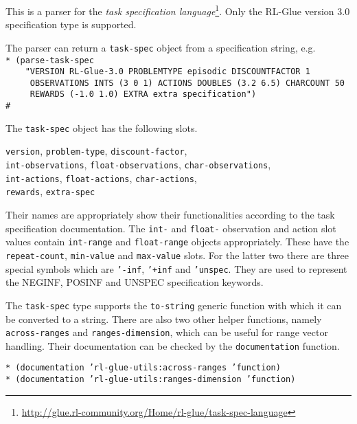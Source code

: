 \documentclass[11pt,a4paper,dvipdfm]{article}
\newcommand{\selfref}[1]{\href{#1}{#1}}
\newcommand{\footref}[2]{\textsl{#1}\footnote{\selfref{#2}}}
\newcommand{\prompttext}[1]{\texttt{#1}}
\newcommand{\lispprompt}[1]{\prompttext{* #1}}
\begin{document}
This is a parser for the
\footref{task specification language}
{http://glue.rl-community.org/Home/rl-glue/task-spec-language}. Only the
RL-Glue version 3.0 specification type is supported.

The parser can return a \prompttext{task-spec} object from a specification
string, e.g. \\
\lispprompt{(parse-task-spec \\
\mbox{~~~~}"VERSION RL-Glue-3.0 PROBLEMTYPE episodic DISCOUNTFACTOR 1 \\
\mbox{~~~~~}OBSERVATIONS INTS (3 0 1) ACTIONS DOUBLES (3.2 6.5) CHARCOUNT 50 \\
\mbox{~~~~~}REWARDS (-1.0 1.0) EXTRA extra specification") \\
\#<TASK-SPEC>}

The \prompttext{task-spec} object has the following slots.

\prompttext{version}, \prompttext{problem-type}, \prompttext{discount-factor}, \\
\prompttext{int-observations}, \prompttext{float-observations},
\prompttext{char-observations}, \\ \prompttext{int-actions},
\prompttext{float-actions}, \prompttext{char-actions}, \\
\prompttext{rewards}, \prompttext{extra-spec}

Their names are appropriately show their functionalities according to the task
specification documentation. The \prompttext{int-} and \prompttext{float-}
observation and action slot values contain \prompttext{int-range} and
\prompttext{float-range} objects appropriately. These have the
\prompttext{repeat-count}, \prompttext{min-value} and \prompttext{max-value}
slots. For the latter two there are three special symbols which are
\prompttext{'-inf}, \prompttext{'+inf} and \prompttext{'unspec}. They are used
to represent the NEGINF, POSINF and UNSPEC specification keywords.

The \prompttext{task-spec} type supports the \prompttext{to-string} generic
function with which it can be converted to a string. There are also two other
helper functions, namely \prompttext{across-ranges} and
\prompttext{ranges-dimension}, which can be useful for range vector handling.
Their documentation can be checked by the \prompttext{documentation} function.

\lispprompt{(documentation 'rl-glue-utils:across-ranges 'function)} \\
\lispprompt{(documentation 'rl-glue-utils:ranges-dimension 'function)}
\end{document}
